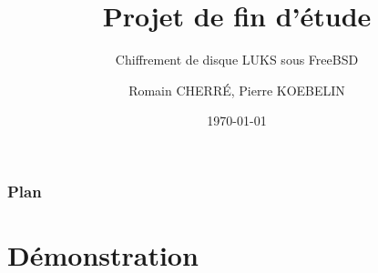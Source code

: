 \documentclass{beamer}
\title[Short title]{Projet de fin d'étude} %
\subtitle{Chiffrement de disque LUKS sous FreeBSD}
\author{Romain CHERRÉ, Pierre KOEBELIN} %
\date{\today} %
\begin{document}
\begin{frame}
  \titlepage %
\end{frame}

\begin{frame}
  \frametitle{Plan} %
  \tableofcontents %
\end{frame}












\section{Démonstration}


\end{document}
